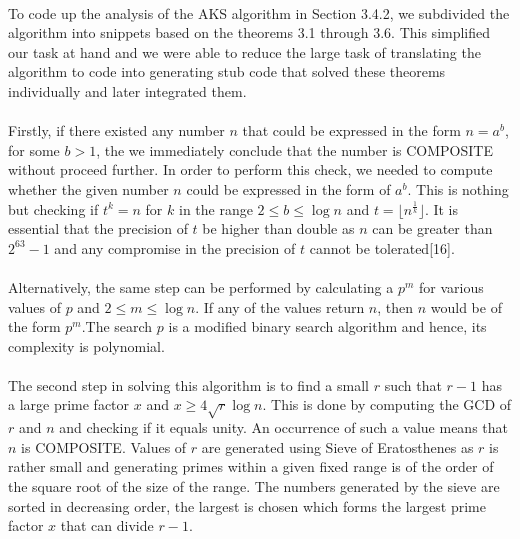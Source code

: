 \documentclass[paper=a4, fontsize=11pt]{scrartcl}	%
\numberwithin{equation}{section}		%
\numberwithin{figure}{section}		%
\numberwithin{table}{section}		%
\begin{document}
\paragraph{}
To code up the analysis of the AKS algorithm in Section 3.4.2, we subdivided the algorithm into snippets based on the theorems 3.1 through 3.6. This simplified our task at hand and we were able to reduce the large task of translating the algorithm to code into generating stub code that solved these theorems individually and later integrated them.

\paragraph{} Firstly, if there existed any number $n$ that could be expressed in the form $n = a^b$, for some $b > 1$, the we immediately conclude that the number is COMPOSITE without proceed further. In order to perform this check, we needed to compute whether the given number $n$ could be expressed in the form of $a^b$. This is nothing but checking if $t^k = n$ for $k$ in the range $2 \leq b \leq \log n$ and $t=\lfloor n^{\frac{1}{k}}\rfloor$. It is essential that the precision of $t$ be higher than double as $n$ can be greater than $2^{63}-1$ and any compromise in the precision of $t$ cannot be tolerated[16].

\paragraph{}Alternatively, the same step can be performed by calculating a $p^m$ for various values of $p$ and $2 \leq m \leq \log n$. If any of the values return $n$, then $n$ would be of the form $p^m$.The search $p$ is a modified binary search algorithm and hence, its complexity is polynomial.

\paragraph{}The second step in solving this algorithm is to find a small $r$ such that $r -1$ has a large prime factor $x$ and $x \geq 4\sqrt{r}\log n$. This is done by computing the GCD of $r$ and $n$ and checking if it equals unity. An occurrence of such a value means that $n$ is COMPOSITE. Values of $r$ are generated using Sieve of Eratosthenes as $r$ is rather small and generating primes within a given fixed range is of the order of the square root of the size of the range. The numbers generated by the sieve are sorted in decreasing order, the largest is chosen which forms the largest prime factor $x$ that can divide $r-1$.
\end{document}

